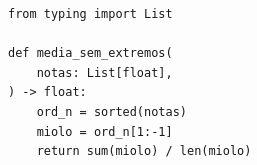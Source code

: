 \ifmostrarGabarito
\begin{verbatim}
from typing import List

def media_sem_extremos(
    notas: List[float],
) -> float:
    ord_n = sorted(notas)
    miolo = ord_n[1:-1]
    return sum(miolo) / len(miolo)
\end{verbatim}

\fi
